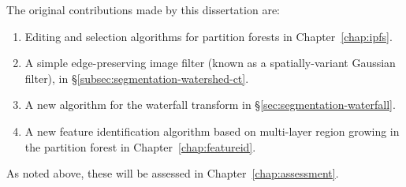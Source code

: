 The original contributions made by this dissertation are:
%
\begin{enumerate}

\item Editing and selection algorithms for partition forests in Chapter~\ref{chap:ipfs}.
\item A simple edge-preserving image filter (known as a spatially-variant Gaussian filter), in \S\ref{subsec:segmentation-watershed-ct}.
\item A new algorithm for the waterfall transform in \S\ref{sec:segmentation-waterfall}.
\item A new feature identification algorithm based on multi-layer region growing in the partition forest in Chapter~\ref{chap:featureid}.

\end{enumerate}
%
As noted above, these will be assessed in Chapter~\ref{chap:assessment}.